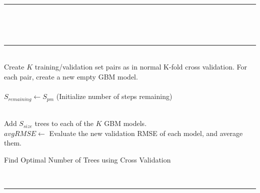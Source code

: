 \documentclass[9pt, conference]{IEEEtran}
\begin{document}
\begin{algorithm}[]
	\hspace{1 mm} \\\hrule\hspace{1 mm} \\
	
	\hspace{1 mm} \\\hrule\hspace{1 mm} \\
	
	Create \(K\) training/validation set pairs as in normal K-fold cross validation. For each pair, create a new empty GBM model. \\
	\hspace{1 mm} \\
	
	\(
	S_{remaining} \leftarrow S_{pm}
	\) (Initialize number of steps remaining) 	\hspace{1 mm} \\\hspace{1 mm} \\

	{
		
		Add \(S_{size}\) trees to each of the \(K\) GBM models.
		\hspace{1 mm} \\
		
		\(avgRMSE \leftarrow \) Evaluate the new validation RMSE of each model, and average them.
		
		
	}
	\caption{Find Optimal Number of Trees using Cross Validation}
	\hspace{1 mm} \\\hrule\hspace{1 mm} \\\hspace{1 mm} \\
	\label{alg:OptNumOfTrees}
\end{algorithm}
\end{document}
